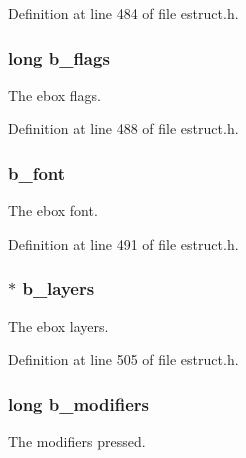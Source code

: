 Definition at line 484 of file estruct.\-h.

\hypertarget{struct__edspbox_abdae234dbd983dfbfb0592858c4ff026}{
\subsubsection[{b\-\_\-flags}]{\setlength{\rightskip}{0pt plus 5cm}long b\-\_\-flags}}\label{struct__edspbox_abdae234dbd983dfbfb0592858c4ff026}
The ebox flags. 

Definition at line 488 of file estruct.\-h.

\hypertarget{struct__edspbox_a4071412a20456f5fcafe2a91cdef11c3}{
\subsubsection[{b\-\_\-font}]{ b\-\_\-font}}\label{struct__edspbox_a4071412a20456f5fcafe2a91cdef11c3}
The ebox font. 

Definition at line 491 of file estruct.\-h.

\hypertarget{struct__edspbox_ad80949f483467d74761a9e321300d64e}{
\subsubsection[{b\-\_\-layers}]{$\ast$ b\-\_\-layers}}\label{struct__edspbox_ad80949f483467d74761a9e321300d64e}
The ebox layers. 

Definition at line 505 of file estruct.\-h.

\hypertarget{struct__edspbox_ad230697acdd2d00abb2dc18dd38089d8}{
\subsubsection[{b\-\_\-modifiers}]{\setlength{\rightskip}{0pt plus 5cm}long b\-\_\-modifiers}}\label{struct__edspbox_ad230697acdd2d00abb2dc18dd38089d8}
The modifiers pressed. 

